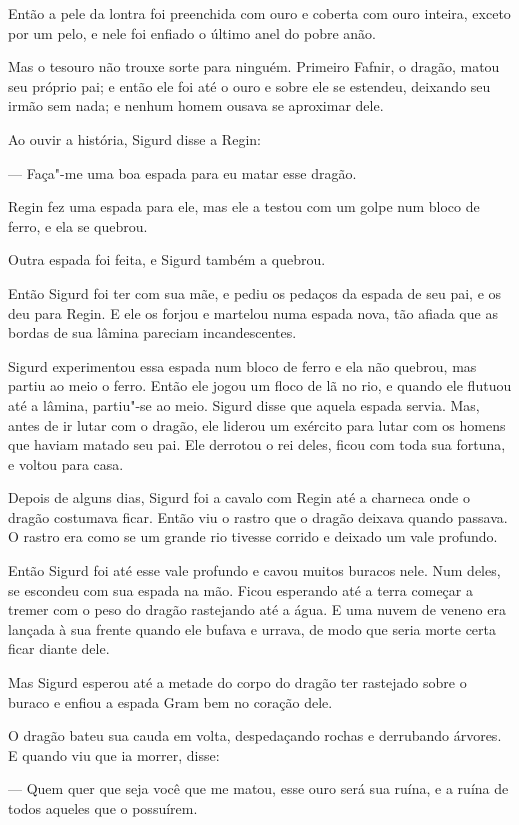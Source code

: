 Então a pele da lontra foi preenchida com ouro e coberta com ouro
inteira, exceto por um pelo, e nele foi enfiado o último anel do
pobre anão. 

Mas o tesouro não trouxe sorte para ninguém. Primeiro Fafnir, o dragão, matou
seu próprio pai; e então ele foi até o ouro e sobre ele se estendeu,
deixando seu irmão sem nada; e nenhum homem ousava
se aproximar dele. 

Ao ouvir a história, Sigurd disse a Regin:

--- Faça"-me uma boa espada para eu matar esse dragão. 

Regin fez uma espada para ele, mas ele a testou com um golpe num bloco
de ferro, e ela se quebrou. 

Outra espada foi feita, e Sigurd também a quebrou. 

Então Sigurd foi ter com sua mãe, e pediu os pedaços da espada de seu
pai, e os deu para Regin. E ele os forjou e martelou numa espada
nova, tão afiada que as bordas de sua lâmina pareciam incandescentes.

Sigurd experimentou essa espada num bloco de ferro e ela não quebrou,
mas partiu ao meio o ferro. Então ele jogou um floco de lã no rio, e
quando ele flutuou até a lâmina, partiu"-se ao meio. Sigurd disse que
aquela espada servia. Mas, antes de ir lutar com o dragão, ele liderou
um exército para lutar com os homens que haviam matado seu pai. Ele
derrotou o rei deles, ficou com toda sua fortuna, e voltou para casa.


Depois de alguns dias, Sigurd foi a cavalo com Regin até a charneca onde
o dragão costumava ficar. Então viu o rastro que o dragão deixava
quando passava. O rastro era como se um grande rio
tivesse corrido e deixado um vale profundo. 

Então Sigurd foi até esse vale profundo e cavou muitos buracos nele.
Num deles, se escondeu com sua espada na mão. Ficou esperando até 
a terra começar a tremer com o peso do dragão rastejando até a
água. E uma nuvem de veneno era lançada à sua frente quando ele
bufava e urrava, de modo que seria morte certa ficar diante dele. 

Mas Sigurd esperou até a metade do corpo do dragão ter rastejado sobre
o buraco e enfiou a espada Gram bem no coração dele. 

O dragão bateu sua cauda em volta, despedaçando rochas e
derrubando árvores. E quando viu que ia morrer, disse:

--- Quem quer que seja você que me matou, esse ouro será sua ruína, e a
ruína de todos aqueles que o possuírem. 

